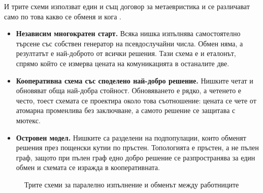 И трите схеми използват един и същ договор за метаевристика и се различават само по
това какво се обменя и кога .

\begin{itemize}[topsep=0pt,itemsep=2pt,leftmargin=*]
\item \textbf{Независим многократен старт.} Всяка нишка изпълнява самостоятелно
      търсене със собствен генератор на псевдослучайни числа. Обмен няма, а
      резултатът е най-доброто от всички решения. Тази схема е и еталонът, спрямо
      който се измерва цената на комуникацията в останалите две.
\item \textbf{Кооперативна схема със споделено най-добро решение.} Нишките четат и
      обновяват обща най-добра стойност. Обновяването е рядко, а четенето е често,
      тоест схемата се проектира около това съотношение: цената се чете от атомарна
      променлива без заключване, а самото решение се защитава с мютекс.
\item \textbf{Островен модел.} Нишките са разделени на подпопулации, които обменят
      решения през пощенски кутии по пръстен. Топологията е пръстен, а не пълен граф,
      защото при пълен граф едно добро решение се разпространява за един обмен и
      схемата се изражда в кооперативната.
\end{itemize}

\begin{figure}[H]
\centering
{}
\caption{Трите схеми за паралелно изпълнение и обменът между работниците}
\label{fig:schemes}
\end{figure}

